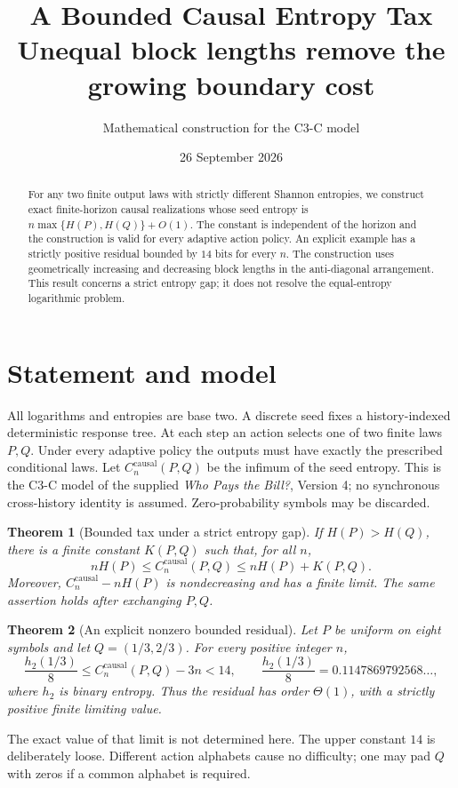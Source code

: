 \documentclass[11pt,a4paper]{article}
\title{A Bounded Causal Entropy Tax\\\large Unequal block lengths remove the growing boundary cost}
\author{Mathematical construction for the C3-C model}
\date{26 September 2026}
\newtheorem{theorem}{Theorem}
\newcommand{\cc}{C^{\mathrm{causal}}}
\begin{document}
\maketitle
\begin{abstract}
For any two finite output laws with strictly different Shannon entropies,
we construct exact finite-horizon causal realizations whose seed entropy is
$n\max\{H(P),H(Q)\}+O(1)$. The constant is independent of the horizon and
the construction is valid for every adaptive action policy. An explicit
example has a strictly positive residual bounded by $14$ bits for every
$n$. The construction uses geometrically increasing and decreasing block
lengths in the anti-diagonal arrangement. This result concerns a strict
entropy gap; it does not resolve the equal-entropy logarithmic problem.
\end{abstract}

\section{Statement and model}
All logarithms and entropies are base two. A discrete seed fixes a
history-indexed deterministic response tree. At each step an action selects
one of two finite laws $P,Q$. Under every adaptive policy the outputs must
have exactly the prescribed conditional laws. Let $\cc_n(P,Q)$ be the
infimum of the seed entropy. This is the C3-C model of the supplied
\emph{Who Pays the Bill?}, Version 4; no synchronous cross-history identity
is assumed. Zero-probability symbols may be discarded.

\begin{theorem}[Bounded tax under a strict entropy gap]\label{thm:general}
If $H(P)>H(Q)$, there is a finite constant $K(P,Q)$ such that, for all $n$,
\[
\boxed{nH(P)\le\cc_n(P,Q)\le nH(P)+K(P,Q).}
\]
Moreover, $\cc_n-nH(P)$ is nondecreasing and has a finite limit.
The same assertion holds after exchanging $P,Q$.
\end{theorem}

\begin{theorem}[An explicit nonzero bounded residual]\label{thm:explicit}
Let $P$ be uniform on eight symbols and let $Q=(1/3,2/3)$. For every
positive integer $n$,
\[
\boxed{\frac{h_2(1/3)}8\le\cc_n(P,Q)-3n<14,}
\qquad \frac{h_2(1/3)}8=0.1147869792568\ldots,
\]
where $h_2$ is binary entropy. Thus the residual has order $\Theta(1)$,
with a strictly positive finite limiting value.
\end{theorem}

The exact value of that limit is not determined here. The upper constant
$14$ is deliberately loose. Different action alphabets cause no difficulty;
one may pad $Q$ with zeros if a common alphabet is required.
\end{document}
